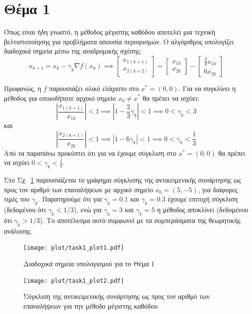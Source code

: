 \documentclass[a4paper,12pt]{article}
\begin{document}
\section*{Θέμα 1}
Όπως είναι ήδη γνωστό, η μέθοδος μέγιστης καθόδου αποτελεί μια τεχνική βελτιστοποίησης για προβλήματα απουσία 
περιορισμών. Ο αλγόριθμος υπολογίζει διαδοχικά σημεία μέσω της αναδρομικής σχέσης: 
\[
x_{k+1} = x_k - \gamma_k \nabla f(x_k) \implies 
\begin{bmatrix} x_{1(k+1)} \\ x_{2(k+2)} \end{bmatrix} = 
\begin{bmatrix} x_{1k} \\ x_{2k} \end{bmatrix}
 - \begin{bmatrix} \frac{2}{3} x_{1k} \\ 6 x_{2k} \end{bmatrix}
\]

Προφανώς, η $f$ παρουσιάζει ολικό ελάχιστο στο $x^* = (0,0)$. Για να συγκλίνει η μέθοδος για οποιοδήποτε αρχικό
σημείο $x_0 \neq x^*$ θα πρέπει να ισχύει:
\[
\left|\frac{x_{1(k+1)}}{x_{1k}}\right| < 1 \implies \left|1 - \frac{2}{3} \gamma_k \right| < 1 
\implies 0 < \gamma_k < 3
\]
και
\[
\left|\frac{x_{2(k+1)}}{x_{2k}}\right| < 1 \implies \left|1 - 6 \gamma_k \right| < 1 
\implies 0 < \gamma_k < \frac{1}{3}
\]
Από τα παραπάνω προκύπτει ότι για να έχουμε σύγκλιση στο $x^* = (0,0)$ θα πρέπει να ισχύει $0 < \gamma_k < \frac{1}{3}$.

Στο Σχ.~\ref{fig:task1_plot2} παρουσιάζεται το γράφημα σύγκλισης της αντικειμενικής συνάρτησης ως προς τον αριθμό των 
επαναλήψεων με αρχικό σημείο $x_0 = (5, -5)$, για διάφορες τιμές του $\gamma_k$. Παρατηρούμε ότι για $\gamma_k = 0.1$ 
και $\gamma_k = 0.3$ έχουμε επιτυχή σύγκλιση (δεδομένου ότι $\gamma_k < 1/3$), ενώ για $\gamma_k = 3$ και $\gamma_k = 5$
η μέθοδος αποκλίνει (δεδομένου ότι $\gamma_k > 1/3$). Το αποτέλεσμα αυτό συμφωνεί με τα συμπεράσματα της θεωρητικής 
ανάλυσης.

\begin{figure}[h]
    \centering
    \begin{minipage}{0.47\textwidth}
        \centering
        \texttt{[image: plot/task1\_plot1.pdf]}
        \caption{\small Διαδοχικά σημεία υπολογισμού για το Θέμα 1}
        \label{fig:task1_plot1}
    \end{minipage} \hfill
    \begin{minipage}{0.47\textwidth}
        \centering
        \texttt{[image: plot/task1\_plot2.pdf]}
        \caption{\small Σύγκλιση της αντικειμενικής συνάρτησης ως προς τον αριθμό των επαναλήψεων για την μέθοδο μέγιστης καθόδου}
        \label{fig:task1_plot2}
    \end{minipage}
\end{figure}
\end{document}
